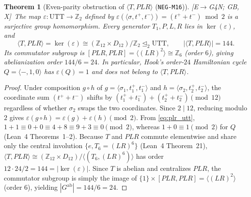 \documentclass[11pt]{amsart}
\numberwithin{equation}{section}
\theoremstyle{plain}
\newtheorem{theorem}{Theorem}[section]
\theoremstyle{definition}\newtheorem{definition}[theorem]{Definition}
\theoremstyle{remark}\newtheorem{remark}[theorem]{Remark}
\newcommand{\Z}{\mathbb{Z}}
\newcommand{\UTT}{\mathrm{UTT}}
\newcommand{\ctag}[1]{\textup{\textsf{\scriptsize[#1]}}}
\begin{document}
\begin{theorem}[Even-parity obstruction of $\langle T, PLR\rangle$ (\texttt{NEG-M16})]\label{thm:parity}
\ctag{E$\to$G4N; GB, X}\ The map $\varepsilon:\UTT\to\Z_2$ defined by $\varepsilon(\langle\sigma,t^+,t^-\rangle) = (t^+ + t^-)\bmod 2$ is a surjective group homomorphism. Every generator $T_1,P,L,R$ lies in $\ker(\varepsilon)$, and
\[
\langle T, PLR\rangle = \ker(\varepsilon) \cong (\Z_{12}\times D_{12})/\Z_2 \trianglelefteq_2 \UTT, \qquad |\langle T, PLR\rangle| = 144.
\]
Its commutator subgroup is $[PLR,PLR]=\langle (LR)^2\rangle\cong\Z_6$ (order $6$), giving abelianization order $144/6=24$. In particular, Hook's order-$24$ Hamiltonian cycle $Q=\langle -,1,0\rangle$ has $\varepsilon(Q)=1$ and does not belong to $\langle T, PLR\rangle$.
\end{theorem}
\begin{proof}
Under composition $g\circ h$ of $g=\langle\sigma_1,t_1^+,t_1^-\rangle$ and $h=\langle\sigma_2,t_2^+,t_2^-\rangle$, the coordinate sum $(t^+ + t^-)$ shifts by $(t_1^+ + t_1^-) + (t_2^+ + t_2^-)\pmod{12}$ regardless of whether $\sigma_2$ swaps the two coordinates. Since $2\mid 12$, reducing modulo $2$ gives $\varepsilon(g\circ h)=\varepsilon(g)+\varepsilon(h)\pmod 2$. From \eqref{eq:plr_utt}, $1+1\equiv 0+0\equiv 4+8\equiv 9+3\equiv 0\pmod 2$, whereas $1+0\equiv 1\pmod 2$ for $Q$ (Lean~4 Theorems~1--2). Because $T$ and $PLR$ commute elementwise and share only the central involution $\{e, T_6=(LR)^6\}$ (Lean~4 Theorem~21), $\langle T,PLR\rangle\cong(\Z_{12}\times D_{12})/\langle(T_6,(LR)^6)\rangle$ has order $12\cdot 24/2=144 = |\ker(\varepsilon)|$. Since $T$ is abelian and centralizes $PLR$, the commutator subgroup is simply the image of $\{1\}\times [PLR,PLR]=\langle(LR)^2\rangle$ (order $6$), yielding $|G^{\mathrm{ab}}|=144/6=24$.
\end{proof}
\end{document}
